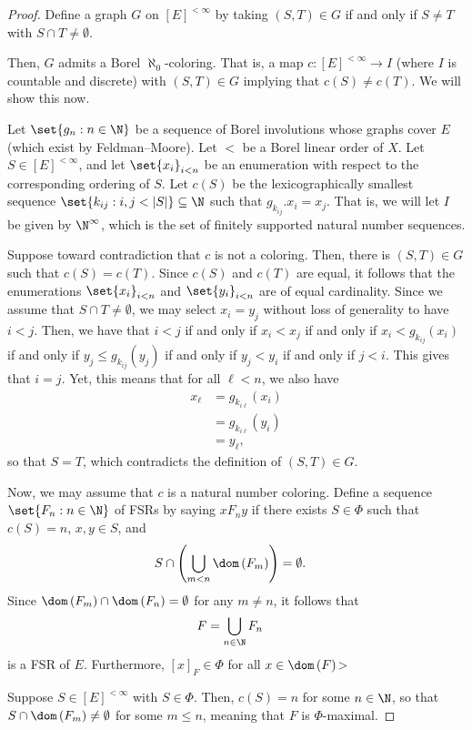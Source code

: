 \documentclass[10pt]{mypackage}
\begin{document}
\begin{proof}
  Define a graph $G$ on $\left[ E \right]^{ <\infty }$ by taking $\left( S,T \right)\in G$ if and only if $S\neq T$ with $S\cap T\neq \emptyset$.

  Then, $G$ admits a Borel $\aleph_0$-coloring. That is, a map $c\colon \left[ E \right]^{ <\infty }\to I$ (where $I$ is countable and discrete) with $\left( S,T \right)\in G$ implying that $c(S)\neq c(T)$. We will show this now.

  Let $\set{g_n : n\in \N}$ be a sequence of Borel involutions whose graphs cover $E$ (which exist by Feldman--Moore). Let $ < $ be a Borel linear order of $X$. Let $S\in \left[ E \right]^{ <\infty }$, and let $\set{x_i}_{ i<n }$ be an enumeration with respect to the corresponding ordering of $S$. Let $c(S)$  be the lexicographically smallest sequence $\set{k_{ij} : i,j < \left\vert S \right\vert}\subseteq \N$ such that $g_{k_{ij}}.x_i = x_j$. That is, we will let $I$ be given by $\N^{ \infty }$, which is the set of finitely supported natural number sequences.

  Suppose toward contradiction that $c$ is not a coloring. Then, there is $\left( S,T \right)\in G$ such that $c(S) = c(T)$. Since $c(S)$ and $c(T)$ are equal, it follows that the enumerations $\set{x_i}_{i < n}$ and $\set{y_i}_{ i < n }$ are of equal cardinality. Since we assume that $S\cap T\neq \emptyset$, we may select $x_i = y_j$ without loss of generality to have $i < j$. Then, we have that $ i < j $ if and only if $x_i < x_j$ if and only if $x_i < g_{k_{ij}}\left( x_i \right)$ if and only if $y_j \leq g_{k_{ij}}\left( y_j \right)$ if and only if $y_j < y_i$ if and only if $j < i$. This gives that $i = j$. Yet, this means that for all $\ell < n$, we also have
  \begin{align*}
    x_{\ell} &= g_{k_{i\ell}} \left( x_i \right)\\
             &= g_{k_{i\ell}}\left( y_i \right)\\
             &= y_{\ell},
  \end{align*}
  so that $S = T$, which contradicts the definition of $\left( S,T \right)\in G$.

  Now, we may assume that $c$ is a natural number coloring. Define a sequence $\set{F_n : n\in \N}$ of FSRs by saying $xF_ny$ if there exists $S\in \Phi$ such that $c(S) = n$, $x,y\in S$, and
  \begin{align*}
    S\cap \left( \bigcup_{m < n}\dom\left( F_m \right) \right) &= \emptyset.
  \end{align*}
  Since $\dom\left( F_m \right)\cap \dom\left( F_n \right) = \emptyset$ for any $m\neq n$, it follows that
  \begin{align*}
    F &= \bigcup_{n\in \N}F_n
  \end{align*}
  is a FSR of $E$. Furthermore, $\left[ x \right]_F\in \Phi$ for all $x\in \dom\left( F \right)$>

  Suppose $S\in \left[ E \right]^{ < \infty }$ with $S\in \Phi$. Then, $c(S) = n$ for some $n\in \N$, so that $S\cap \dom\left( F_m \right)\neq \emptyset$ for some $m\leq n$, meaning that $F$ is $\Phi$-maximal.
\end{proof}
\end{document}
